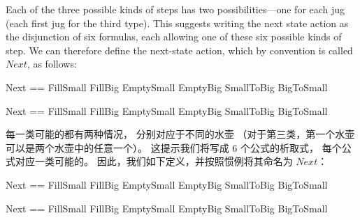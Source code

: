 \begin{en}
Each of the three possible kinds of steps has two possibilities---one
for each jug (each first jug for the third type).  This suggests
writing the next state action as the disjunction of six formulas, each
allowing one of these six possible kinds of step.  We can therefore
define the next-state action, which by convention is called $Next$, as
follows:
\medskip
\begin{twocols}%
\begin{notla}
Next == \/ FillSmall 
        \/ FillBig    
        \/ EmptySmall 
        \/ EmptyBig    
        \/ SmallToBig    
        \/ BigToSmall 
\end{notla}
\begin{tlatex}
%
%
%
%
%
%
\end{tlatex}
\midcol
\begin{verbatim*}
Next == \/ FillSmall 
        \/ FillBig    
        \/ EmptySmall 
        \/ EmptyBig    
        \/ SmallToBig    
        \/ BigToSmall 
\end{verbatim*}
\end{twocols}
\medskip
\end{en}
\begin{ch}
  每一类可能的\tlastep{}都有两种情况，
  分别对应于不同的水壶
  （对于第三类\tlastep{}，第一个水壶可以是两个水壶中的任意一个）。
  这提示我们将\tlanextstateaction{}写成 6 个公式的析取式，
  每个公式对应一类可能的\tlastep{}。
  因此，我们如下定义\tlanextstateaction{}，并按照惯例将其命名为 $Next$：
  \medskip
  \begin{twocols}%
  \begin{notla}
  Next == \/ FillSmall 
	  \/ FillBig    
	  \/ EmptySmall 
	  \/ EmptyBig    
	  \/ SmallToBig    
	  \/ BigToSmall 
  \end{notla}
  \begin{tlatex}
  \end{tlatex}
  \midcol
  \begin{verbatim*}
  Next == \/ FillSmall 
	  \/ FillBig    
	  \/ EmptySmall 
	  \/ EmptyBig    
	  \/ SmallToBig    
	  \/ BigToSmall 
  \end{verbatim*}
  \end{twocols}
  \medskip
\end{ch}
